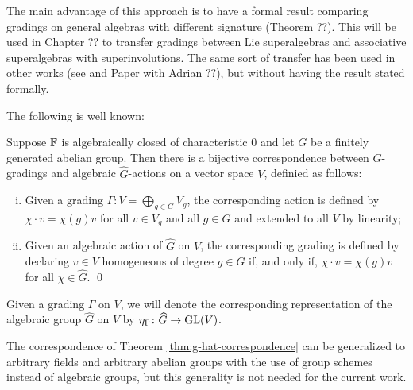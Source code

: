 The main advantage of this approach is to have a formal result comparing gradings on general algebras with different signature (Theorem ??). 
This will be used in Chapter ?? to transfer gradings between Lie superalgebras and associative superalgebras with superinvolutions. 
The same sort of transfer has been used in other works (see \cite{livromicha} and Paper with Adrian ??), but without having the result stated formally.


The following is well known:

\begin{thm}\label{thm:g-hat-correspondence}
    Suppose $\mathbb{F}$ is algebraically closed of characteristic $0$ and let $G$ be a finitely generated abelian group. 
    Then there is a bijective correspondence between $G$-gradings and algebraic $\widehat G$-actions on a vector space $V$, definied as follows:
    \begin{enumerate}[(i)]
        \item Given a grading $\Gamma: V = \bigoplus_{g\in G} V_g$, the corresponding action is defined by $\chi\cdot v = \chi(g) v$ for all $v\in V_g$ and all $g\in G$ and extended to all $V$ by linearity;
        \item Given an algebraic action of $\widehat G$ on $V$, the corresponding grading is defined by declaring $v\in V$ homogeneous of degree $g\in G$ if, and only if, $\chi\cdot v = \chi(g) v$ for all $\chi \in \widehat G$. \label{item:action-to-grading} \qed
    \end{enumerate}
\end{thm}

\begin{notation}
    Given a grading $\Gamma$ on $V$, we will denote the corresponding representation of the algebraic group $\widehat G$ on $V$ by $\eta_\Gamma\colon \widehat G \to \operatorname{GL}(V)$.
\end{notation}

\begin{remark}
    The correspondence of Theorem \ref{thm:g-hat-correspondence} can be generalized to arbitrary fields and arbitrary abelian groups with the use of group schemes instead of algebraic groups, but this generality is not needed for the current work.
\end{remark}


